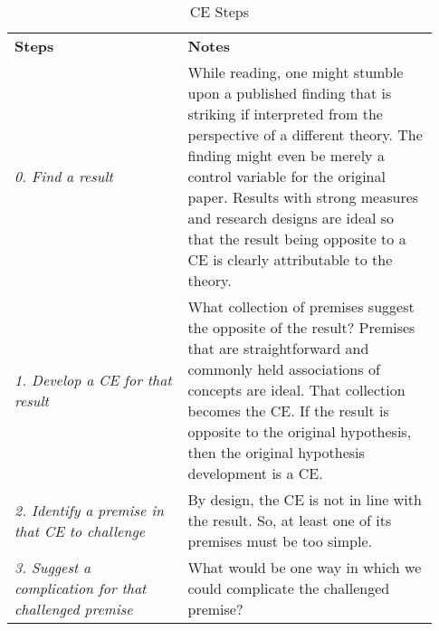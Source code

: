 \documentclass[authordate, meta,issue]{jote-new-article}
\begin{document}
\begin{table}[t!]
  \begin{fullwidth}
    \caption{CE Steps}
    \label{tab:3}

    \begin{tabularx}{\columnwidth}{@{}>{\RaggedRight\arraybackslash}p{0.38\linewidth} >{\RaggedRight\arraybackslash}p{0.55\linewidth}@{}}

      \textbf{Steps}                                                               & \textbf{Notes}                                                                                                                                                                                                                                                                                    \\
      \emph{0. Find a result}                                                      & While reading, one might stumble upon a published finding that is striking if interpreted from the perspective of a different theory. The finding might even be merely a control variable for the original paper.
      \newline Results with strong measures and research designs are ideal so that the result being opposite to a CE is clearly attributable to the theory.                                                                                                                                                                                                                            \\
      \emph{1. Develop a CE for that result}                                       & What collection of premises suggest the opposite of the result? Premises that are  straightforward and commonly held  associations of concepts are ideal. That collection becomes the CE. If the result is opposite to the original hypothesis, then the original hypothesis development is a CE. \\
      \emph{2. Identify a premise in that CE to challenge}                         & By design, the CE is not in line with the result. So, at least one of its premises must be too simple.                                                                                                                                                                                            \\
      \emph{3. Suggest a complication for that challenged premise}                 & What would be one way in which we could complicate the challenged premise?                                                                                                                                                                                                                        \\

\end{tabularx}
\end{fullwidth}
\end{table}
\end{document}
